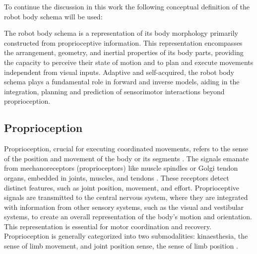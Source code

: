 To continue the discussion in this work the following conceptual definition of the robot body schema will be used:
\begin{shaded}
	\begin{definition}\label{def:robot_body_schema}
		The robot body schema is a representation of its body morphology primarily constructed from proprioceptive information. This representation encompasses the arrangement, geometry, and inertial properties of its body parts, providing the capacity to perceive their state of motion and to plan and execute movements independent from visual inputs. Adaptive and self-acquired, the robot body schema plays a fundamental role in forward and inverse models, aiding in the integration, planning and prediction of sensorimotor interactions beyond proprioception.
	\end{definition}
\end{shaded}

\subsection{Proprioception}
Proprioception, crucial for executing coordinated movements, refers to the sense of the position and movement of the body or its segments \cite{Kenzie2017compositeroboticbased}. The signals emanate from mechanoreceptors (proprioceptors) like muscle spindles or Golgi tendon organs, embedded in joints, muscles, and tendons \cite{Proske2012proprioceptivesensestheir}. These receptors detect distinct features, such as joint position, movement, and effort. Proprioceptive signals are transmitted to the central nervous system, where they are integrated with information from other sensory systems, such as the visual and vestibular systems, to create an overall representation of the body's motion and orientation. This representation is essential for motor coordination and recovery. Proprioception is generally categorized into two submodalities: kinaesthesia, the sense of limb movement, and joint position sense, the sense of limb position \cite{DAntonio2021RoboticAssessmentWrist,Hillier2015AssessingProprioceptionSystematic}.

